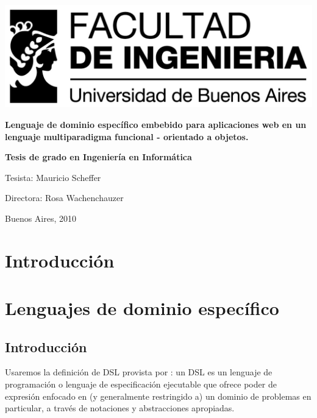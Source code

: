 \documentclass[12pt]{report}
\begin{document}
\thispagestyle{empty}

\begin {center}

\includegraphics[scale=1]{logo_fiuba_alta.jpg}

\vspace{3cm}

\textbf{\LARGE Lenguaje de dominio específico embebido para aplicaciones web en un lenguaje multiparadigma funcional - orientado a objetos.}

\vspace{3cm}

\textbf{\Large Tesis de grado en Ingeniería en Informática}

\vspace{2cm}

\end {center}
\vspace{3cm}

Tesista: Mauricio Scheffer

Directora: Rosa Wachenchauzer

Buenos Aires, 2010

\newpage

\tableofcontents

\newpage

\chapter{Introducci\'on}

\chapter{Lenguajes de dominio espec\'ifico}

\section{Introducci\'on}

Usaremos la definición de DSL provista por \cite{van2000domain}: un DSL es un lenguaje de programación o lenguaje de especificación ejecutable que ofrece poder de expresión enfocado en (y generalmente restringido a) un dominio de problemas en particular, a través de notaciones y abstracciones apropiadas.
\end{document}
